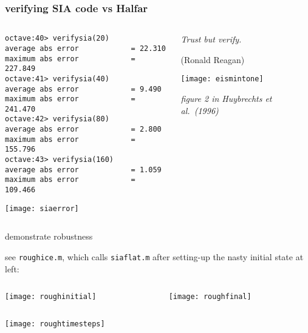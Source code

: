 \begin{frame}[fragile]
\frametitle{verifying SIA code vs Halfar}
\label{slide:verifysia}

\begin{columns}
\begin{column}{0.6\textwidth}
\scriptsize
\begin{verbatim}
octave:40> verifysia(20)
average abs error            = 22.310
maximum abs error            = 227.849
octave:41> verifysia(40)
average abs error            = 9.490
maximum abs error            = 241.470
octave:42> verifysia(80)
average abs error            = 2.800
maximum abs error            = 155.796
octave:43> verifysia(160)
average abs error            = 1.059
maximum abs error            = 109.466
\end{verbatim}
\normalsize

\texttt{[image: siaerror]}
\end{column}

\begin{column}{0.4\textwidth}
\small
\emph{Trust but verify.}
\medskip

\scriptsize
(Ronald Reagan)

\bigskip\bigskip\bigskip

\texttt{[image: eismintone]}

\scriptsize \emph{figure 2 in Huybrechts et al.~(1996)}
\end{column}
\end{columns}
\end{frame}


\begin{frame}{demonstrate robustness}

see \texttt{roughice.m}, which calls \texttt{siaflat.m} after setting-up the nasty initial state at left:
\medskip

\begin{columns}
\begin{column}{0.5\textwidth}
\texttt{[image: roughinitial]}
\end{column}
\begin{column}{0.5\textwidth}
\texttt{[image: roughfinal]}
\end{column}
\end{columns}

\begin{center}
\texttt{[image: roughtimesteps]}
\end{center}
\end{frame}


